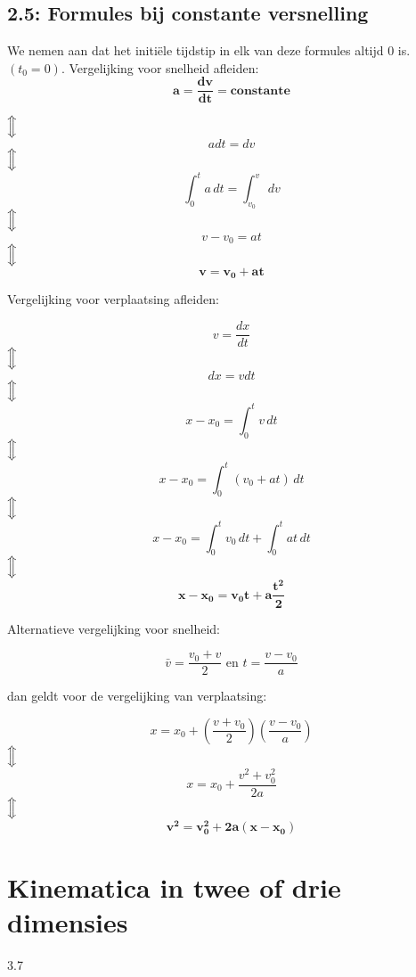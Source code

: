 \documentclass[12pt,a4paper]{article}
\newcommand{\Luda}{\Big\Updownarrow}
\begin{document}
    \subsection{2.5: Formules bij constante versnelling}
    We nemen aan dat het initiële tijdstip in elk van deze formules altijd 0 is. \((t_{0} = 0)\).
    Vergelijking voor snelheid afleiden:
    \[\mathbf{a = \frac{dv}{dt} = constante}\]
    \begin{center}
	    $\Luda$ \[a dt = dv\]
	    $\Luda$ \[\int_{0}^{t} a \, dt = \int_{v_0}^{v} \,dv\]
	    $\Luda$\[v - v_0 = at\]
	    $\Luda$\[\mathbf{v = v_0 + at}\]
    \end{center}
\newpage
    Vergelijking voor verplaatsing afleiden:
    \begin{center}
               \[v = \frac{dx}{dt}\]
	    $\Luda$\[dx = v dt\]
	    $\Luda$\[x - x_0 = \int_{0}^{t} v \, dt\]
	    $\Luda$\[x - x_0 = \int_{0}^{t} (v_0 + at) \, dt\]
	    $\Luda$\[x - x_0 = \int_{0}^{t} v_0 \, dt + \int_{0}^{t} at \, dt\]
	    $\Luda$\[\mathbf{x - x_0 = v_0t + a\frac{t^2}{2}}\]
    \end{center}
    Alternatieve vergelijking voor snelheid:
    \begin{center}
    	\[\bar{v} = \frac{v_0 + v}{2} \text{ en } t = \frac{v - v_0}{a}\]
    \end{center}
    dan geldt voor de vergelijking van verplaatsing:
    \begin{center}
               \[x = x_0 + (\frac{v + v_0}{2})(\frac{v - v_0}{a})\]
	    $\Luda$\[x = x_0 + \frac{v^2 + v_0^2}{2a}\]
	    $\Luda$\[\mathbf{v^2 = v_0^2 + 2a(x - x_0)}\]
    \end{center}


    \section{Kinematica in twee of drie dimensies}
    3.7
\end{document}
